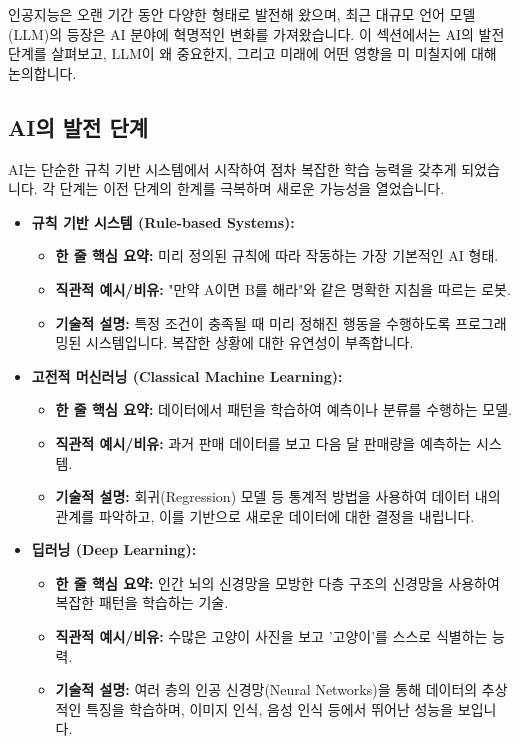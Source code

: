 \documentclass[11pt,a4paper]{article}
\theoremstyle{definition}
\begin{document}
인공지능은 오랜 기간 동안 다양한 형태로 발전해 왔으며, 최근 대규모 언어 모델(LLM)의 등장은 AI 분야에 혁명적인 변화를 가져왔습니다. 이 섹션에서는 AI의 발전 단계를 살펴보고, LLM이 왜 중요한지, 그리고 미래에 어떤 영향을 미 미칠지에 대해 논의합니다.

\subsection{AI의 발전 단계}

AI는 단순한 규칙 기반 시스템에서 시작하여 점차 복잡한 학습 능력을 갖추게 되었습니다. 각 단계는 이전 단계의 한계를 극복하며 새로운 가능성을 열었습니다.

\begin{itemize}
    \item \textbf{규칙 기반 시스템 (Rule-based Systems):}
    \begin{itemize}
        \item \textbf{한 줄 핵심 요약:} 미리 정의된 규칙에 따라 작동하는 가장 기본적인 AI 형태.
        \item \textbf{직관적 예시/비유:} "만약 A이면 B를 해라"와 같은 명확한 지침을 따르는 로봇.
        \item \textbf{기술적 설명:} 특정 조건이 충족될 때 미리 정해진 행동을 수행하도록 프로그래밍된 시스템입니다. 복잡한 상황에 대한 유연성이 부족합니다.
    \end{itemize}

    \item \textbf{고전적 머신러닝 (Classical Machine Learning):}
    \begin{itemize}
        \item \textbf{한 줄 핵심 요약:} 데이터에서 패턴을 학습하여 예측이나 분류를 수행하는 모델.
        \item \textbf{직관적 예시/비유:} 과거 판매 데이터를 보고 다음 달 판매량을 예측하는 시스템.
        \item \textbf{기술적 설명:} 회귀(Regression) 모델 등 통계적 방법을 사용하여 데이터 내의 관계를 파악하고, 이를 기반으로 새로운 데이터에 대한 결정을 내립니다.
    \end{itemize}

    \item \textbf{딥러닝 (Deep Learning):}
    \begin{itemize}
        \item \textbf{한 줄 핵심 요약:} 인간 뇌의 신경망을 모방한 다층 구조의 신경망을 사용하여 복잡한 패턴을 학습하는 기술.
        \item \textbf{직관적 예시/비유:} 수많은 고양이 사진을 보고 '고양이'를 스스로 식별하는 능력.
        \item \textbf{기술적 설명:} 여러 층의 인공 신경망(Neural Networks)을 통해 데이터의 추상적인 특징을 학습하며, 이미지 인식, 음성 인식 등에서 뛰어난 성능을 보입니다.
    \end{itemize}


\end{itemize}
\end{document}
